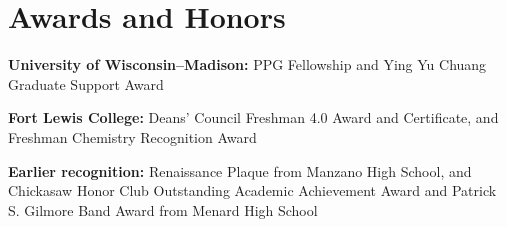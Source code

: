 \section{Awards and Honors}
\textbf{University of Wisconsin--Madison:} PPG Fellowship and Ying Yu Chuang Graduate Support Award\par
\textbf{Fort Lewis College:} Deans' Council Freshman 4.0 Award and Certificate, and Freshman Chemistry Recognition Award\par
\textbf{Earlier recognition:} Renaissance Plaque from Manzano High School, and Chickasaw Honor Club Outstanding Academic Achievement Award and Patrick S. Gilmore Band Award from Menard High School
